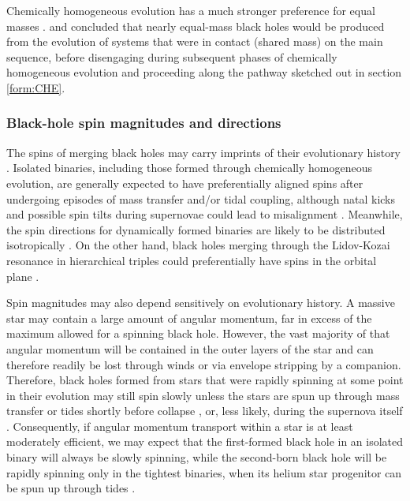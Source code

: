 \documentclass[review]{elsarticle}
\begin{document}
Chemically homogeneous evolution has a much stronger preference for equal masses \citep{MandeldeMink:2016}.  \citet{Marchant:2016} and \citet{Riley:2020} concluded that nearly equal-mass black holes would be produced from the evolution of systems that were in contact (shared mass) on the main sequence, before disengaging during subsequent phases of chemically homogeneous evolution and proceeding along the pathway sketched out in section \ref{form:CHE}. 

\subsubsection{Black-hole spin magnitudes and directions}\label{BHspins}
The spins of merging black holes may carry imprints of their evolutionary history \citep[e.g.,][]{GerosaBerti:2017}.  Isolated binaries, including those formed through chemically homogeneous evolution, are generally expected to have preferentially aligned spins after undergoing episodes of mass transfer and/or tidal coupling, although natal kicks and possible spin tilts during supernovae could lead to misalignment \citep[e.g.,][]{Kalogera:2000,Farr:2011,Tauris:2017}.  Meanwhile, the spin directions for dynamically formed binaries are likely to be distributed isotropically \citep[e.g.,][]{Rodriguez:2016spin}.  On the other hand, black holes merging through the Lidov-Kozai resonance in hierarchical triples could preferentially have spins in the orbital plane \citep{LiuLai:2018,RodriguezAntonini:2018}.

Spin magnitudes may also depend sensitively on evolutionary history.  A massive star may contain a large amount of angular momentum, far in excess of the maximum allowed for a spinning black hole. However, the vast majority of that angular momentum will be contained in the outer layers of the star and can therefore readily be lost through winds or via envelope stripping by a companion.  Therefore, black holes formed from stars that were rapidly spinning at some point in their evolution may still spin slowly unless the stars are spun up through mass transfer or tides shortly before collapse \citep{Kushnir:2016,HotokezakaPiran:2017,Zaldarriaga:2017}, or, less likely, during the supernova itself \citep{Batta:2017,Schroeder:2018}.   Consequently, if angular momentum transport within a star is at least moderately efficient, we may expect that the first-formed black hole in an isolated binary will always be slowly spinning, while the second-born black hole will be rapidly spinning only in the tightest binaries, when its helium star progenitor can be spun up through tides \citep{Bavera:2019,Belczynski:2020,MandelFragos:2020,Bavera:2021,OlejakBelczynski:2021}.
\end{document}
